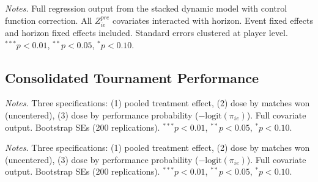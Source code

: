 \begin{table}[htbp]
\centering
\caption{WTA Non-Grand-Slam: Full Dynamic Effects Regression}
\label{tab:dynamic_full_nongs_wta}
\begin{threeparttable}
\footnotesize

\begin{tablenotes}
\scriptsize
\item \textit{Notes.} Full regression output from the stacked dynamic model with control function correction. All $Z^{pre}_{ie}$ covariates interacted with horizon. Event fixed effects and horizon fixed effects included. Standard errors clustered at player level. $^{***}p<0.01$, $^{**}p<0.05$, $^{*}p<0.10$.
\end{tablenotes}
\end{threeparttable}
\end{table}

\subsection{Consolidated Tournament Performance}
\label{app:tournament_consolidated}

\begin{table}[htbp]
\centering
\caption{Consolidated Tournament Performance: Grand Slam ATP}
\label{tab:tournament_consolidated_gs_atp}
\begin{threeparttable}
\footnotesize

\begin{tablenotes}
\scriptsize
\item \textit{Notes.} Three specifications: (1) pooled treatment effect, (2) dose by matches won (uncentered), (3) dose by performance probability ($-\text{logit}(\pi_{ie})$). Full covariate output. Bootstrap SEs (200 replications). $^{***}p<0.01$, $^{**}p<0.05$, $^{*}p<0.10$.
\end{tablenotes}
\end{threeparttable}
\end{table}

\begin{table}[htbp]
\centering
\caption{Consolidated Tournament Performance: Grand Slam WTA}
\label{tab:tournament_consolidated_gs_wta}
\begin{threeparttable}
\footnotesize

\begin{tablenotes}
\scriptsize
\item \textit{Notes.} Three specifications: (1) pooled treatment effect, (2) dose by matches won (uncentered), (3) dose by performance probability ($-\text{logit}(\pi_{ie})$). Full covariate output. Bootstrap SEs (200 replications). $^{***}p<0.01$, $^{**}p<0.05$, $^{*}p<0.10$.
\end{tablenotes}
\end{threeparttable}
\end{table}

